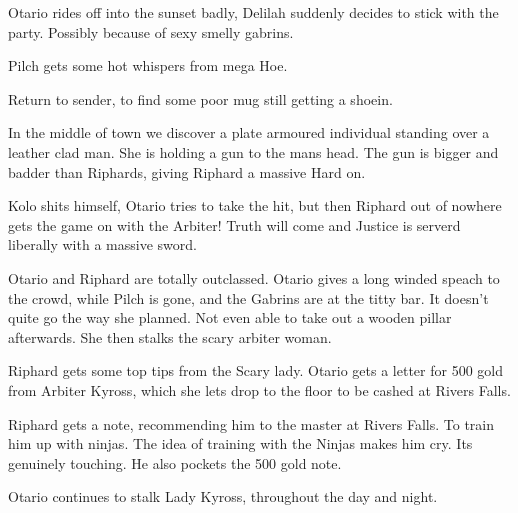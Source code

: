 Otario rides off into the sunset badly, Delilah suddenly decides to stick with the party. Possibly because of sexy smelly gabrins.    

Pilch gets some hot whispers from mega Hoe.    

Return to sender, to find some poor mug still getting a shoein.    

In the middle of town we discover a plate armoured individual standing over a leather clad man. She is holding a gun to the mans head. The gun is bigger and badder than Riphards, giving Riphard a massive Hard on.    

Kolo shits himself, Otario tries to take the hit, but then Riphard out of nowhere gets the game on with the Arbiter! Truth will come and Justice is serverd liberally with a massive sword.    

Otario and Riphard are totally outclassed. Otario gives a long winded speach to the crowd, while Pilch is gone, and the Gabrins are at the titty bar. It doesn’t quite go the way she planned. Not even able to take out a wooden pillar afterwards. She then stalks the scary arbiter woman.    

Riphard gets some top tips from the Scary lady. Otario gets a letter for 500 gold from Arbiter Kyross, which she lets drop to the floor to be cashed at Rivers Falls.    

Riphard gets a note, recommending him to the master at Rivers Falls. To train him up with ninjas. The idea of training with the Ninjas makes him cry. Its genuinely touching. He also pockets the 500 gold note.    

Otario continues to stalk Lady Kyross, throughout the day and night. 
\clearpage